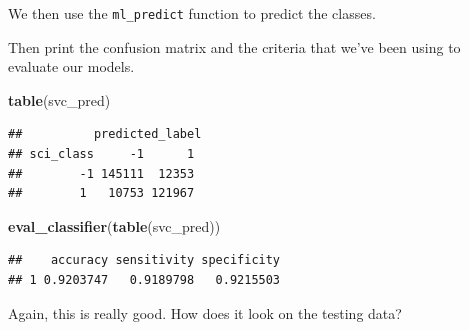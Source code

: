 \documentclass[]{book}
\newenvironment{Shaded}{\begin{snugshade}}{\end{snugshade}}
\newcommand{\KeywordTok}[1]{\textcolor[rgb]{0.13,0.29,0.53}{\textbf{#1}}}
\newcommand{\NormalTok}[1]{#1}
\newcommand{\OperatorTok}[1]{\textcolor[rgb]{0.81,0.36,0.00}{\textbf{#1}}}
\newcommand{\StringTok}[1]{\textcolor[rgb]{0.31,0.60,0.02}{#1}}
\begin{document}
\begin{Shaded}
\end{Shaded}

We then use the \texttt{ml\_predict} function to predict the classes.

\begin{Shaded}
\end{Shaded}

Then print the confusion matrix and the criteria that we've been using to evaluate our models.

\begin{Shaded}
\begin{Highlighting}[]
\KeywordTok{table}\NormalTok{(svc_pred)}
\end{Highlighting}
\end{Shaded}

\begin{verbatim}
##          predicted_label
## sci_class     -1      1
##        -1 145111  12353
##        1   10753 121967
\end{verbatim}

\begin{Shaded}
\begin{Highlighting}[]
\KeywordTok{eval_classifier}\NormalTok{(}\KeywordTok{table}\NormalTok{(svc_pred))}
\end{Highlighting}
\end{Shaded}

\begin{verbatim}
##    accuracy sensitivity specificity
## 1 0.9203747   0.9189798   0.9215503
\end{verbatim}

Again, this is really good. How does it look on the testing data?

\begin{Shaded}
\end{Shaded}
\end{document}
